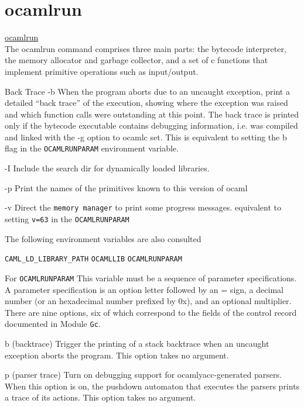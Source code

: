 \section{ocamlrun}
\label{sec:ocamlrun}

\href{http://caml.inria.fr/pub/docs/manual-ocaml/manual024.html#toc88}{ocamlrun}  \\


The ocamlrun command comprises three main parts: the bytecode
interpreter, the memory allocator and garbage collector, and a set of
c functions that implement primitive operations such as input/output.


Back Trace -b When the program aborts due to an uncaught exception,
print a detailed ``back trace'' of the execution, showing where the
exception was raised and which function calls were outstanding at this
point. The back trace is printed only if the bytecode executable
contains debugging information, i.e. was compiled and linked with the
-g option to ocamlc set. This is equivalent to setting the b flag in
the \verb|OCAMLRUNPARAM| environment variable.

-I Include the search dir for dynamically loaded libraries.


-p Print the names of the primitives known to this version of ocaml

-v Direct the \verb|memory manager| to print some progress messages.
equivalent to setting \verb|v=63| in the \verb|OCAMLRUNPARAM|


The following environment variables are also consulted

\verb|CAML_LD_LIBRARY_PATH|
\verb|OCAMLLIB|
\verb|OCAMLRUNPARAM|



For \verb|OCAMLRUNPARAM| This variable must be a sequence of parameter
specifications. A parameter specification is an option letter followed
by an = sign, a decimal number (or an hexadecimal number prefixed by
0x), and an optional multiplier. There are nine options, six of which
correspond to the fields of the control record documented in Module
\verb|Gc|.



b
(backtrace) Trigger the printing of a stack backtrace when an uncaught
exception aborts the program. This option takes no argument.


p
(parser trace) Turn on debugging support for ocamlyacc-generated
parsers. When this option is on, the pushdown automaton that executes
the parsers prints a trace of its actions. This option takes no
argument.


